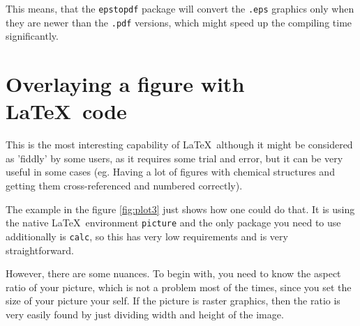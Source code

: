 This means, that the \verb|epstopdf| package will convert the \verb|.eps|
graphics only when they are newer than the \verb|.pdf| versions, which might
speed up the compiling time significantly.

\clearpage
\section{Overlaying a figure with \LaTeX\ code}

This is the most interesting capability of \LaTeX\ although it might be
considered as 'fiddly' by some users, as it requires some trial and error, but
it can be very useful in some cases (eg. Having a lot of figures with chemical
structures and getting them cross-referenced and numbered correctly).

The example in the figure \ref{fig:plot3} just shows how one could do that. It
is using the native \LaTeX\ environment \verb|picture| and the only package you
need to use additionally is \verb|calc|, so this has very low requirements and
is very straightforward.




However, there are some nuances. To begin with, you need to know the aspect
ratio of your picture, which is not a problem most of the times, since you set
the size of your picture your self. If the picture is raster graphics, then the
ratio is very easily found by just dividing width and height of the image.



